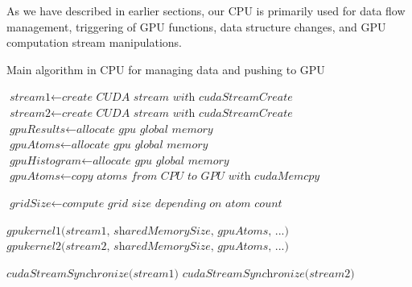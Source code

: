 \documentclass[12pt,letterpaper]{report}
\begin{document}
\noindent\hspace{3em} As we have described in earlier sections, our CPU is primarily used for data flow management, triggering of GPU functions, data structure changes, and GPU computation stream manipulations.
\begin{algorithm}
\caption{Main algorithm in CPU for managing data and pushing to GPU}
\label{alg:cpuflow}
\begin{algorithmic}[1]

\State $\textit{stream1} \gets \textit{create CUDA stream with cudaStreamCreate}$
\State $\textit{stream2} \gets \textit{create CUDA stream with cudaStreamCreate}$
\State
\State $\textit{gpuResults} \gets \textit{allocate gpu global memory}$
\State $\textit{gpuAtoms} \gets \textit{allocate gpu global memory}$
\State $\textit{gpuHistogram} \gets \textit{allocate gpu global memory}$
\State
\State $\textit{gpuAtoms} \gets \textit{copy atoms from CPU to GPU with cudaMemcpy}$

\State $\textit{gridSize} \gets \textit{compute grid size depending on atom count}$

\State


\State $\textit{gpukernel1(stream1, sharedMemorySize, gpuAtoms, ...)}$
\State $\textit{gpukernel2(stream2, sharedMemorySize, gpuAtoms, ...)}$

\State
\State $\textit{cudaStreamSynchronize(stream1)}$
\State $\textit{cudaStreamSynchronize(stream2)}$

\EndFor

\EndProcedure
\end{algorithmic}
\end{algorithm}
\end{document}
